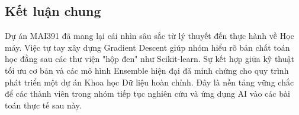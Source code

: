 \subsection{Kết luận chung}
Dự án MAI391 đã mang lại cái nhìn sâu sắc từ lý thuyết đến thực hành về Học máy. Việc tự tay xây dựng Gradient Descent giúp nhóm hiểu rõ bản chất toán học đằng sau các thư viện "hộp đen" như Scikit-learn. Sự kết hợp giữa kỹ thuật tối ưu cơ bản và các mô hình Ensemble hiện đại đã minh chứng cho quy trình phát triển một dự án Khoa học Dữ liệu hoàn chỉnh. Đây là nền tảng vững chắc để các thành viên trong nhóm tiếp tục nghiên cứu và ứng dụng AI vào các bài toán thực tế sau này.